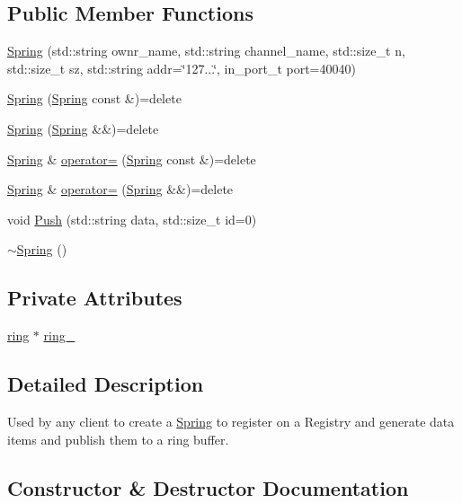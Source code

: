 \subsection*{Public Member Functions}
\begin{DoxyCompactItemize}
\item 
\hyperlink{classSpring_abbbfe22a2b37ec7df976e7c2536541bf}{Spring} (std\+::string ownr\+\_\+name, std\+::string channel\+\_\+name, std\+::size\+\_\+t n, std\+::size\+\_\+t sz, std\+::string addr=\char`\"{}127...\char`\"{}, in\+\_\+port\+\_\+t port=40040)
\item 
\hyperlink{classSpring_a70cd0c870d6afdf75bb4fcaafdbcdf41}{Spring} (\hyperlink{classSpring}{Spring} const \&)=delete
\item 
\hyperlink{classSpring_abe45ef79d37d2353383b4b24b38d7d88}{Spring} (\hyperlink{classSpring}{Spring} \&\&)=delete
\item 
\hyperlink{classSpring}{Spring} \& \hyperlink{classSpring_a3e15b14976e488d841565ed53a9b23ff}{operator=} (\hyperlink{classSpring}{Spring} const \&)=delete
\item 
\hyperlink{classSpring}{Spring} \& \hyperlink{classSpring_a0eae24fff36dcab466577403fb8bd78d}{operator=} (\hyperlink{classSpring}{Spring} \&\&)=delete
\item 
void \hyperlink{classSpring_acd49d999d964fe6f8165163974cd2968}{Push} (std\+::string data, std\+::size\+\_\+t id=0)
\item 
\hyperlink{classSpring_a8b5c6088814c8e343be53682f33866f1}{$\sim$\+Spring} ()
\end{DoxyCompactItemize}
\subsection*{Private Attributes}
\begin{DoxyCompactItemize}
\item 
\hyperlink{structring}{ring} $\ast$ \hyperlink{classSpring_a9f017cfb37f70e8e9ce9d72efbd9be73}{ring\+\_\+}
\end{DoxyCompactItemize}


\subsection{Detailed Description}
Used by any client to create a \hyperlink{classSpring}{Spring} to register on a Registry and generate data items and publish them to a ring buffer. 

\subsection{Constructor \& Destructor Documentation}
\mbox{\label{classSpring_abbbfe22a2b37ec7df976e7c2536541bf}} 
